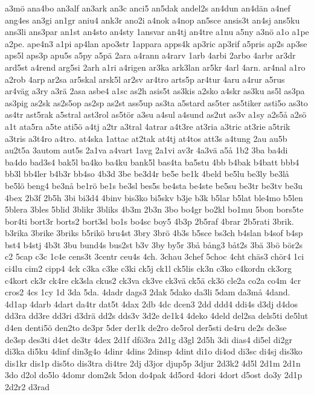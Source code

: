 {{a3m^^f6
ana4bo
an3alf
an3ark
an3c
anci5
an5dak
andel2s
an4dun
an4d^^e4n
a4nef
ang4es
an3gi
an1gr
aniu4
ank3r
ano2i
a4nok
a4nop
an5sce
ansis3t
an4sj
ans5ku
ans3li
ans3par
an1st
an4sto
an4sty
1ansvar
an4tj
an4tre
a1nu
a5ny
a3n^^f6
a1o
a1pe
a2pe.
ape4n3
a1pi
ap4lan
apo3str
1appara
apps4k
ap3ric
ap3rif
a5pris
ap2s
ap3se
aps5l
aps3p
apu5s
a5py
a5p^^e4
2ara
a4rann
a4rarv
1arb
4arbi
2arbo
4arbr
ar3dr
ard5st
a4rend
arg5si
2arh
a1ri
a4rigen
ar3ka
ark3lan
ar5kr
4arl
4arn.
ar4nal
a1ro
a2rob
4arp
ar2sa
ar5skal
arsk5l
ar2sv
ar4tro
arts5p
ar4tur
4aru
a4rur
a5rus
ar4v^^e4g
a3ry
a3r^^e4
2asa
asbe4
a1sc
as2h
asis5t
as3kis
a2sko
a4skr
as3ku
as5l
as3pa
as3pig
as2sk
as2s5op
as2sp
as2st
ass5up
as3ta
a5stard
as5ter
as5tiker
asti5o
as3to
as4tr
ast5rak
a5stral
ast3rol
as5t^^f6r
a3su
a4sul
a4sund
as2ut
as3v
a1sy
a2s5^^e5
a2s^^f6
a1t
ata5ra
a5te
ati5^^f6
a4tj
a2tr
a3tral
4atrar
a4t3re
at3ria
a3tric
at3rie
a5trik
a3tris
a3t4ro
a4tro.
at4ska
1attac
at2tak
at4tj
at4tos
att3s
a4tung
2au
au5b
au2t5a
3autom
aut5s
2a1va
a4vart
1avg
2a1vi
av3r
4a3v^^e4
a5^^e5
1b2
3ba
ba4di
ba4do
bad3s4
bak5l
ba4ko
ba4ku
bank5l
bas4ta
ba5stu
4bb
b4bak
b4batt
bbb4
bb3l
bb4ler
b4b3r
bb4so
4b3d
3be
be3d4r
be5e
be1k
4beld
be5lu
be3ly
be3l^^e5
be5l^^f6
beng4
be3n^^e5
be1r^^f6
be1s
be3sl
bes5s
be4sta
be4ste
be5su
be3tr
be3tv
be3u
4bex
2b3f
2b5h
3bi
bi3d4
4binv
bis3ko
bi5skv
b3je
b3k
b5lar
b5lat
ble4mo
b5len
5blera
3bles
5blid
3blikr
3bliks
4b3m
2b3n
3bo
bo4gr
bo2kl
bo1mu
5bon
bors5te
bor4ti
bort3r
borts2
bort3sl
bo1s
bo4sc
boy5
4b3p
2b5raf
4brar
2b5rati
3brik.
b3rika
3brike
3briks
b5rik^^f6
bru4st
3bry
3br^^f6
4b3s
b5sce
bs3ch
b4slan
b4sof
b4sp
bst4
b4stj
4b3t
3bu
bund4s
bus2st
b3v
3by
by5r
3b^^e5
b^^e5ng3
b^^e5t2s
3b^^e4
3b^^f6
b^^f6r2s
c2
5cap
c3c
1c4e
cens3t
3centr
ceu4s
4ch.
3chau
3chef
5choc
4cht
ch^^e4s3
ch^^f6r4
1ci
ci4lu
cim2
cipp4
4ck
c3ka
c3ke
c3ki
ck5j
ck1l
ck5lis
ck3n
c3ko
c4kordn
ck3org
c4kort
ck3r
ck4re
ck3sla
ckus2
ck3va
ck3ve
ck3v^^e4
ck5^^e4
ck3^^f6
cle2a
co2a
co4m
4cr
cros2
4cs
1cy
1d
3da
5da.
4dadr
dags3
2dak
5dako
da3li
5dam
da3m^^e5
4dand.
4d1ap
4darb
4dart
da4tr
dat5t
4dax
2db
4dc
dcen3
2dd
ddd4
ddi4s
d3dj
d4dos
dd3ra
dd3re
dd3ri
d3dr^^e4
dd2s
dds3v
3d2e
de1k4
4deko
4deld
del2sa
dels5ti
de5lut
d4en
denti5^^f6
den2to
de3pr
5der
der1k
de2ro
de5rol
der5sti
de4ru
de2s
de3se
de3sp
des3ti
d4et
de3tr
4dex
2d1f
df^^f63ra
2d1g
d3gl
2d5h
3di
dias4
di5el
di2gr
di3ka
di5ku
4dinf
din3g4o
4dinr
4dins
2dinsp
4dint
di1o
di4od
di3sc
di4sj
dis3ko
dis1kr
dis1p
dis5to
dis3tra
di4tre
2dj
d3jor
djup5p
3djur
2d3k2
4d5l
2d1m
2d1n
3do
d2ol
do5lo
4domr
dom2sk
5don
do4pak
4d5ord
4dori
4dort
d5ost
do3y
2d1p
2d2r2
d3rad
}}
